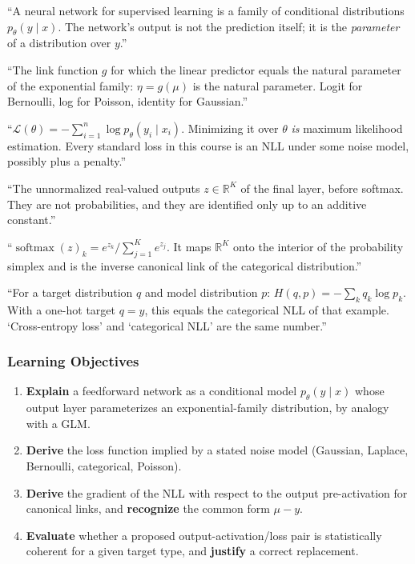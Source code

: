 \documentclass[11pt]{article}
\newcommand{\softmax}{\operatorname{softmax}}
\newcommand{\R}{\mathbb{R}}
\begin{document}
\begin{keydefs}[ -- Topic 1.1]
\begin{description}[leftmargin=0pt]
  \item[Conditional model.] ``A neural network for supervised learning is a family of conditional distributions $p_\theta(y\mid x)$. The network's output is not the prediction itself; it is the \emph{parameter} of a distribution over $y$.''
  \item[Canonical link.] ``The link function $g$ for which the linear predictor equals the natural parameter of the exponential family: $\eta = g(\mu)$ is the natural parameter. Logit for Bernoulli, log for Poisson, identity for Gaussian.''
  \item[Negative log-likelihood (NLL).] ``$\mathcal{L}(\theta) = -\sum_{i=1}^n \log p_\theta(y_i\mid x_i)$. Minimizing it over $\theta$ \emph{is} maximum likelihood estimation. Every standard loss in this course is an NLL under some noise model, possibly plus a penalty.''
  \item[Logits.] ``The unnormalized real-valued outputs $z \in \R^K$ of the final layer, before softmax. They are not probabilities, and they are identified only up to an additive constant.''
  \item[Softmax.] ``$\softmax(z)_k = e^{z_k} / \sum_{j=1}^K e^{z_j}$. It maps $\R^K$ onto the interior of the probability simplex and is the inverse canonical link of the categorical distribution.''
  \item[Cross-entropy.] ``For a target distribution $q$ and model distribution $p$: $H(q,p) = -\sum_k q_k \log p_k$. With a one-hot target $q = y$, this equals the categorical NLL of that example. `Cross-entropy loss' and `categorical NLL' are the same number.''
\end{description}
\end{keydefs}

\subsubsection*{Learning Objectives}
\begin{enumerate}[label=\textbf{LO 1.1.\arabic*}, leftmargin=*]
  \item \textbf{Explain} a feedforward network as a conditional model $p_\theta(y\mid x)$ whose output layer parameterizes an exponential-family distribution, by analogy with a GLM.
  \item \textbf{Derive} the loss function implied by a stated noise model (Gaussian, Laplace, Bernoulli, categorical, Poisson).
  \item \textbf{Derive} the gradient of the NLL with respect to the output pre-activation for canonical links, and \textbf{recognize} the common form $\mu - y$.
  \item \textbf{Evaluate} whether a proposed output-activation/loss pair is statistically coherent for a given target type, and \textbf{justify} a correct replacement.
\end{enumerate}
\end{document}
